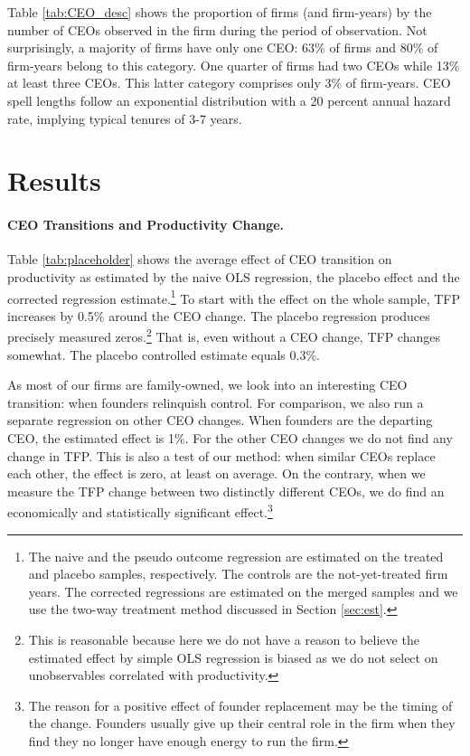 \documentclass[11pt,a4paper]{article}
\begin{document}
Table \ref{tab:CEO_desc} shows the proportion of firms (and firm-years) by the number of CEOs observed in the firm during the period of observation. Not surprisingly, a majority of firms have only one CEO: 63\% of firms and 80\% of firm-years belong to this category. One quarter of firms had two CEOs while 13\% at least three CEOs. This latter category comprises only 3\% of firm-years. CEO spell lengths follow an exponential distribution with a 20 percent annual hazard rate, implying typical tenures of 3-7 years.


\section{Results}



\paragraph{CEO Transitions and Productivity Change.} Table \ref{tab:placeholder} shows the average effect of CEO transition on productivity as estimated by the naive OLS regression, the placebo effect and the corrected regression estimate.\footnote{The naive and the pseudo outcome regression are estimated on the treated and placebo samples, respectively. The controls are the not-yet-treated firm years. The corrected regressions are estimated on the merged samples and we use the two-way treatment method discussed in Section \ref{sec:est}.} To start with the effect on the whole sample, TFP increases by 0.5\% around the CEO change. The placebo regression produces precisely measured zeros.\footnote{This is reasonable because here we do not have a reason to believe the estimated effect by simple OLS regression is biased as we do not select on unobservables correlated with productivity.} That is, even without a CEO change, TFP changes somewhat. The placebo controlled estimate equals 0.3\%. 

As most of our firms are family-owned, we look into an interesting CEO transition: when founders relinquish control. For comparison, we also run a separate regression on other CEO changes. When founders are the departing CEO, the estimated effect is 1\%. For the other CEO changes we do not find any change in TFP. This is also a test of our method: when similar CEOs replace each other, the effect is zero, at least on average. On the contrary, when we measure the TFP change between two distinctly different CEOs, we do find an economically and statistically significant effect.\footnote{The reason for a positive effect of founder replacement may be the timing of the change. Founders usually give up their central role in the firm when they find they no longer have enough energy to run the firm.} 
\end{document}
